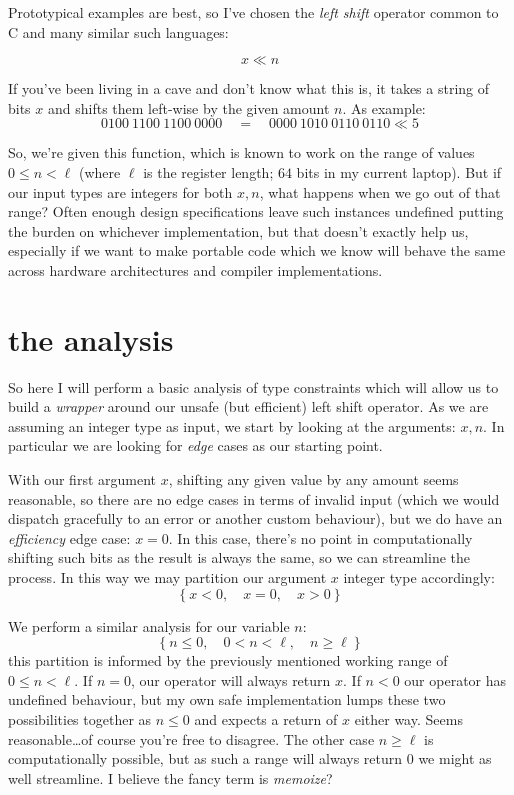 \documentclass[twoside]{article}
\begin{document}
Prototypical examples are best, so I've chosen the \emph{left shift}
operator common to C and many similar such languages:

$$ x \ll n $$

If you've been living in a cave and don't know what this is, it takes a string of bits $ x $
and shifts them left-wise by the given amount $ n $. As example:
$$ 0100\ 1100\ 1100\ 0000\quad =\quad 0000\ 1010\ 0110\ 0110 \ll 5 $$

So, we're given this function, which is known to work on the range of values $ 0\le n < \ell $ (where $ \ell $
is the register length; $ 64 $ bits in my current laptop). But if our input types are integers for both $ x, n $,
what happens when we go out of that range? Often enough design specifications leave such instances undefined
putting the burden on whichever implementation, but that doesn't exactly help us, especially if we want to
make portable code which we know will behave the same across hardware architectures and compiler implementations.

\section*{the analysis}

So here I will perform a basic analysis of type constraints which will allow us to build a \emph{wrapper}
around our unsafe (but efficient) left shift operator. As we are assuming an integer type as input,
we start by looking at the arguments: $ x, n $. In particular we are looking for \emph{edge} cases
as our starting point.

With our first argument $ x $, shifting any given value by any amount seems reasonable, so there are no
edge cases in terms of invalid input (which we would dispatch gracefully to an error or another custom behaviour),
but we do have an \emph{efficiency} edge case: $ x=0 $. In this case, there's no point in computationally
shifting such bits as the result is always the same, so we can streamline the process. In this way we may
partition our argument $ x $ integer type accordingly:
$$ \{\ x < 0,\quad x = 0,\quad x > 0 \ \} $$

We perform a similar analysis for our variable $ n $:
$$ \{\ n \le 0,\quad 0 < n < \ell,\quad n \ge \ell \ \} $$
this partition is informed by the previously mentioned working range of $ 0\le n < \ell $. If $ n = 0 $,
our operator will always return $ x $. If $ n < 0 $ our operator has undefined behaviour, but my own
safe implementation lumps these two possibilities together as $ n \le 0 $ and expects a return of $ x $
either way. Seems reasonable\ldots of course you're free to disagree. The other case $ n\ge \ell $ is computationally
possible, but as such a range will always return $ 0 $ we might as well streamline. I believe the fancy term
is \emph{memoize}?
\end{document}

